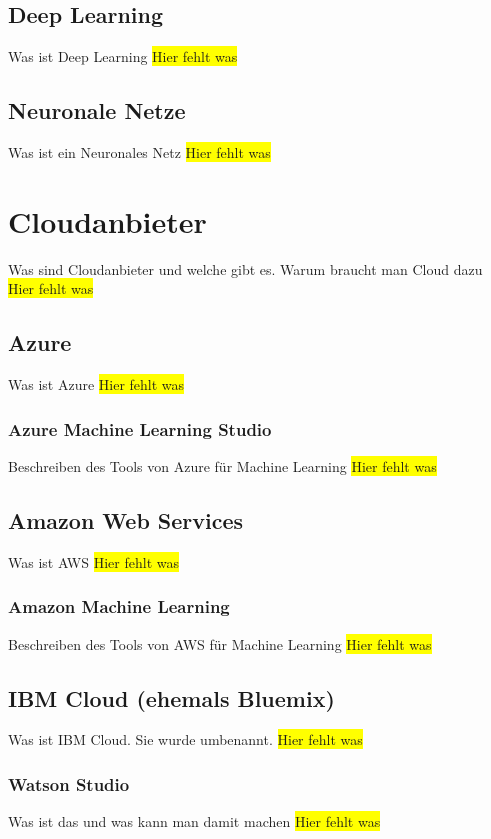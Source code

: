 \subsection{Deep Learning}
Was ist Deep Learning
\colorbox{yellow}{Hier fehlt was}

\subsection{Neuronale Netze}
Was ist ein Neuronales Netz
\colorbox{yellow}{Hier fehlt was}

\section{Cloudanbieter}
Was sind Cloudanbieter und welche gibt es. Warum braucht man Cloud dazu
\colorbox{yellow}{Hier fehlt was}

\subsection{Azure}
Was ist Azure
\colorbox{yellow}{Hier fehlt was}

\subsubsection{Azure Machine Learning Studio}
Beschreiben des Tools von Azure für Machine Learning
\colorbox{yellow}{Hier fehlt was}

\subsection{Amazon Web Services}
Was ist AWS
\colorbox{yellow}{Hier fehlt was}

\subsubsection{Amazon Machine Learning}
Beschreiben des Tools von AWS für Machine Learning
\colorbox{yellow}{Hier fehlt was}

\subsection{IBM Cloud (ehemals Bluemix)}
Was ist IBM Cloud. Sie wurde umbenannt.
\colorbox{yellow}{Hier fehlt was}

\subsubsection{Watson Studio}
Was ist das und was kann man damit machen
\colorbox{yellow}{Hier fehlt was}

